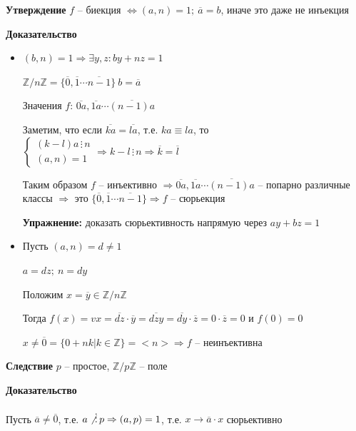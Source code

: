\documentclass[14pt, letter paper]{article}
\begin{document}
\textbf{Утверждение} $f$ -- биекция $\Leftrightarrow (a, n) = 1;\ \overline{a} = b$, иначе это даже не инъекция

\begin{center}
    \textbf{Доказательство}
\end{center}

\begin{itemize}
    \item $(b,n) = 1 \Rightarrow \exists y, z: by + nz = 1$

    $\mathbb{Z}/n\mathbb{Z} = \{ \overline{0}, \overline{1} \cdots \overline{n-1} \}\ b = \overline{a}$

    Значения $f$: $\overline{0a}, \overline{1a} \cdots \overline{(n-1)a}$

    Заметим, что если $\overline{ka} = \overline{la}$, т.е. $ka \equiv la$, то $\begin{cases}
        (k-l)a \, \vdots \, n \\
        (a,n) = 1
    \end{cases} \Rightarrow k-l \, \vdots \, n \Rightarrow \overline{k} = \overline{l}$

    Таким образом $f$ -- инъективно $\Rightarrow \overline{0a}, \overline{1a} \cdots \overline{(n-1)a}$ -- попарно различные классы $\Rightarrow$ это $\{ \overline{0}, \overline{1} \cdots \overline{n-1}\} \Rightarrow f$ -- сюрьекция
    
    \textbf{Упражнение:} доказать сюрьективность напрямую через $ay + bz = 1$

    \item Пусть $(a,n) = d \neq 1$

    $a = dz;\ n = dy$

    Положим $x = \overline{y} \in \mathbb{Z}/n\mathbb{Z}$

    Тогда $f(x) = vx = \overline{dz} \cdot \overline{y} = \overline{dzy} = \overline{dy} \cdot \overline{z} = 0 \cdot \overline{z} = 0$ и $f(0) = 0$

    $x \neq \overline{0} = \{ 0 + nk | k \in \mathbb{Z}\} = <n> \Rightarrow f$ -- неинъективна
\end{itemize}

\textbf{Следствие} $p$ -- простое, $\mathbb{Z}/p\mathbb{Z}$ -- поле

\begin{center}
    \textbf{Доказательство}
\end{center}

Пусть $\overline{a} \neq \overline{0}$, т.е. $a \not\, \vdots \, p \Rightarrow (a,p) = 1$, т.е. $x \rightarrow \overline{a} \cdot x$ сюрьективно
\end{document}
